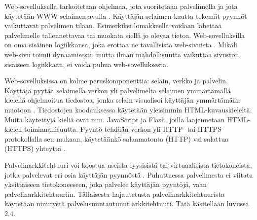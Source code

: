 Web-sovelluksella tarkoitetaan ohjelmaa, jota suoritetaan palvelimella ja jota käytetään WWW-selaimen avulla \cite{uml}. Käyttäjän selaimen kautta tekemät pyynnöt vaikuttavat palvelimen tilaan. Esimerkiksi lomakkeella voidaan lähettää palvelimelle tallennettavaa tai muokata siellä jo olevaa tietoa. Web-sovelluksilla on oma sisäinen logiikkansa, joka erottaa ne tavallisista web-sivuista \cite{uml}. Mikäli web-sivu toimii dynaamisesti, mutta ilman mahdollisuutta vaikuttaa sivuston sisäiseen logiikkaan, ei voida puhua web-sovelluksesta.

Web-sovelluksissa on kolme peruskomponenttia: selain, verkko ja palvelin. Käyttäjä pyytää selaimella verkon yli palvelimelta selaimen ymmärtämällä kielellä ohjelmoitua tiedostoa, jonka selain visualisoi käyttäjän ymmärtämään muotoon \cite{uml}. Tiedostojen koodauksessa käytetään yleisimmin HTML-kuvauskieleltä. Muita käytettyjä kieliä ovat mm. JavaScript ja Flash, joilla laajennetaan HTML-kielen toiminnallisuutta. Pyyntö tehdään verkon yli HTTP- tai HTTPS-protokollalla sen mukaan, käytetäänkö salaamatonta (HTTP) vai salattua (HTTPS) yhteyttä \cite{rfc2818}.

Palvelinarkkitehtuuri voi koostua useista fyysisistä tai virtuaalisista tietokoneista, jotka palvelevat eri osia käyttäjän pyynnöstä \cite{soa}. Puhuttaessa palvelimesta ei viitata yksittäiseen tietokoneeseen, joka palvelee käyttäjän pyyntöjä, vaan pal\-ve\-lin\-ark\-ki\-teh\-tuu\-riin. Tällaisesta hajautetusta palvelinarkkitehtuurista käytetään nimitystä palvelusuuntautunut arkkitehtuuri. Tätä käsitellään luvussa 2.4.